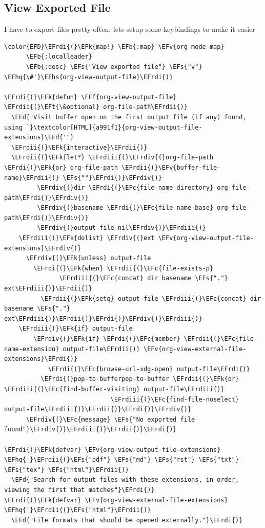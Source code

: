\documentclass{scrartcl}
\newcommand{\EFk}[1]{\textcolor{EFk}{#1}} %
\newcommand{\EFd}[1]{\textcolor{EFd}{#1}} %
\newcommand{\EFt}[1]{\textcolor{EFt}{#1}} %
\newcommand{\EFs}[1]{\textcolor{EFs}{#1}} %
\newcommand{\EFb}[1]{\textcolor{EFb}{#1}} %
\newcommand{\EFc}[1]{\textcolor{EFc}{#1}} %
\newcommand{\EFv}[1]{\textcolor{EFv}{#1}} %
\newcommand{\EFf}[1]{\textcolor{EFf}{#1}} %
\newcommand{\EFhq}[1]{#1} %
\newcommand{\EFhs}[1]{#1} %
\newcommand{\EFrdi}[1]{#1} %
\newcommand{\EFrdii}[1]{#1} %
\newcommand{\EFrdiii}[1]{#1} %
\newcommand{\EFrdiv}[1]{#1} %
\begin{document}
\subsection{View Exported File}
\label{sec:orgdb4377c}
I have to export files pretty often, lets setup some keybindings to make it easier
\begin{Code}
\begin{Verbatim}[]
\color{EFD}\EFrdi{(}\EFk{map!} \EFb{:map} \EFv{org-mode-map}
      \EFb{:localleader}
      \EFb{:desc} \EFs{"View exported file"} \EFs{"v"} \EFhq{\#'}\EFhs{org-view-output-file}\EFrdi{)}

\EFrdi{(}\EFk{defun} \EFf{org-view-output-file} \EFrdii{(}\EFt{\&optional} org-file-path\EFrdii{)}
  \EFd{"Visit buffer open on the first output file (if any) found, using `}\textcolor[HTML]{a991f1}{org-view-output-file-extensions}\EFd{'"}
  \EFrdii{(}\EFk{interactive}\EFrdii{)}
  \EFrdii{(}\EFk{let*} \EFrdiii{(}\EFrdiv{(}org-file-path \EFrdi{(}\EFk{or} org-file-path \EFrdii{(}\EFv{buffer-file-name}\EFrdii{)} \EFs{""}\EFrdi{)}\EFrdiv{)}
         \EFrdiv{(}dir \EFrdi{(}\EFc{file-name-directory} org-file-path\EFrdi{)}\EFrdiv{)}
         \EFrdiv{(}basename \EFrdi{(}\EFc{file-name-base} org-file-path\EFrdi{)}\EFrdiv{)}
         \EFrdiv{(}output-file nil\EFrdiv{)}\EFrdiii{)}
    \EFrdiii{(}\EFk{dolist} \EFrdiv{(}ext \EFv{org-view-output-file-extensions}\EFrdiv{)}
      \EFrdiv{(}\EFk{unless} output-file
        \EFrdi{(}\EFk{when} \EFrdii{(}\EFc{file-exists-p}
               \EFrdiii{(}\EFc{concat} dir basename \EFs{"."} ext\EFrdiii{)}\EFrdii{)}
          \EFrdii{(}\EFk{setq} output-file \EFrdiii{(}\EFc{concat} dir basename \EFs{"."} ext\EFrdiii{)}\EFrdii{)}\EFrdi{)}\EFrdiv{)}\EFrdiii{)}
    \EFrdiii{(}\EFk{if} output-file
        \EFrdiv{(}\EFk{if} \EFrdi{(}\EFc{member} \EFrdii{(}\EFc{file-name-extension} output-file\EFrdii{)} \EFv{org-view-external-file-extensions}\EFrdi{)}
            \EFrdi{(}\EFc{browse-url-xdg-open} output-file\EFrdi{)}
          \EFrdi{(}pop-to-bufferpop-to-buffer \EFrdii{(}\EFk{or} \EFrdiii{(}\EFc{find-buffer-visiting} output-file\EFrdiii{)}
                             \EFrdiii{(}\EFc{find-file-noselect} output-file\EFrdiii{)}\EFrdii{)}\EFrdi{)}\EFrdiv{)}
      \EFrdiv{(}\EFc{message} \EFs{"No exported file found"}\EFrdiv{)}\EFrdiii{)}\EFrdii{)}\EFrdi{)}

\EFrdi{(}\EFk{defvar} \EFv{org-view-output-file-extensions} \EFhq{'}\EFrdii{(}\EFs{"pdf"} \EFs{"md"} \EFs{"rst"} \EFs{"txt"} \EFs{"tex"} \EFs{"html"}\EFrdii{)}
  \EFd{"Search for output files with these extensions, in order, viewing the first that matches"}\EFrdi{)}
\EFrdi{(}\EFk{defvar} \EFv{org-view-external-file-extensions} \EFhq{'}\EFrdii{(}\EFs{"html"}\EFrdii{)}
  \EFd{"File formats that should be opened externally."}\EFrdi{)}
\end{Verbatim}
\end{Code}
\end{document}
